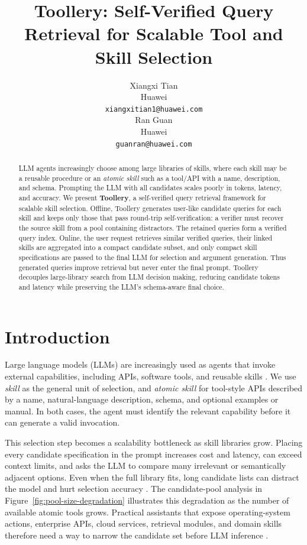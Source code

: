 \documentclass[11pt]{article}
\title{Toollery: Self-Verified Query Retrieval for Scalable Tool and Skill Selection}
\author{Xiangxi Tian \\
  Huawei \\
  \texttt{xiangxitian1@huawei.com} \\\And
  Ran Guan \\
  Huawei \\
  \texttt{guanran@huawei.com} \\}
\begin{document}
\maketitle
\begin{abstract}
LLM agents increasingly choose among large libraries of skills, where each skill may be a reusable procedure or an \emph{atomic skill} such as a tool/API with a name, description, and schema. Prompting the LLM with all candidates scales poorly in tokens, latency, and accuracy. We present \textbf{Toollery}, a self-verified query retrieval framework for scalable skill selection. Offline, Toollery generates user-like candidate queries for each skill and keeps only those that pass round-trip self-verification: a verifier must recover the source skill from a pool containing distractors. The retained queries form a verified query index. Online, the user request retrieves similar verified queries, their linked skills are aggregated into a compact candidate subset, and only compact skill specifications are passed to the final LLM for selection and argument generation. Thus generated queries improve retrieval but never enter the final prompt. Toollery decouples large-library search from LLM decision making, reducing candidate tokens and latency while preserving the LLM's schema-aware final choice.
\end{abstract}

\section{Introduction}
\label{sec:intro}

Large language models (LLMs) are increasingly used as agents that invoke external capabilities, including APIs, software tools, and reusable skills \citep{schick2023toolformer, qin2023toolllm, patil2024gorilla, yao2022webshop}. We use \emph{skill} as the general unit of selection, and \emph{atomic skill} for tool-style APIs described by a name, natural-language description, schema, and optional examples or manual. In both cases, the agent must identify the relevant capability before it can generate a valid invocation.

This selection step becomes a scalability bottleneck as skill libraries grow. Placing every candidate specification in the prompt increases cost and latency, can exceed context limits, and asks the LLM to compare many irrelevant or semantically adjacent options. Even when the full library fits, long candidate lists can distract the model and hurt selection accuracy \citep{paramanayakam2025less}. The candidate-pool analysis in Figure~\ref{fig:pool-size-degradation} illustrates this degradation as the number of available atomic tools grows. Practical assistants that expose operating-system actions, enterprise APIs, cloud services, retrieval modules, and domain skills therefore need a way to narrow the candidate set before LLM inference \citep{wu2024copilot, boto3, mo2025livemcpbench, xu2025tps}.
\end{document}
